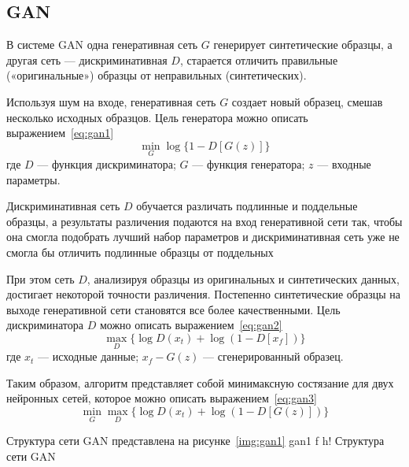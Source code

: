 \subsection{GAN}

В системе GAN одна генеративная сеть $G$ генерирует
синтетические образцы, а другая сеть --- дискриминативная $D$, старается отличить правильные («оригинальные») образцы от неправильных (синтетических).


Используя шум на входе, генеративная сеть $G$ создает новый образец, смешав несколько исходных образцов. Цель генератора можно описать выражением~\ref{eq:gan1}
\begin{equation}\label{eq:gan1}
	\min _G \log\{1-D[G(z)]\}
\end{equation}
где $D$ --- функция дискриминатора; $G$ --- функция генератора; $z$ --- входные параметры.

Дискриминативная сеть $D$ обучается различать подлинные и поддельные образцы, а результаты различения подаются на вход генеративной сети так, чтобы она смогла подобрать лучший набор параметров и дискриминативная сеть уже не смогла бы отличить подлинные образцы от поддельных

При этом сеть $D$, анализируя образцы из оригинальных и синтетических данных, достигает некоторой точности различения.
Постепенно синтетические образцы на выходе генеративной сети становятся все более качественными. Цель дискриминатора $D$ можно описать выражением~\ref{eq:gan2}
\begin{equation}\label{eq:gan2}
	\max _D \{\log D(x_t) + \log (1-D[x_f])\}
\end{equation}
где $x_t$ --- исходные данные; $x_f - G(z)$ --- сгенерированный образец.

Таким образом, алгоритм представляет собой минимаксную состязание для двух
нейронных сетей, которое можно описать выражением~\ref{eq:gan3}
\begin{equation}\label{eq:gan3}
	\min _G \max _D \{\log D(x_t) + \log (1-D[G(z)])\}
\end{equation}




Структура сети GAN представлена на рисунке~\ref{img:gan1}
{gan1} %
{f} %
{h!} %
{\textwidth} %
{Структура сети GAN} %



